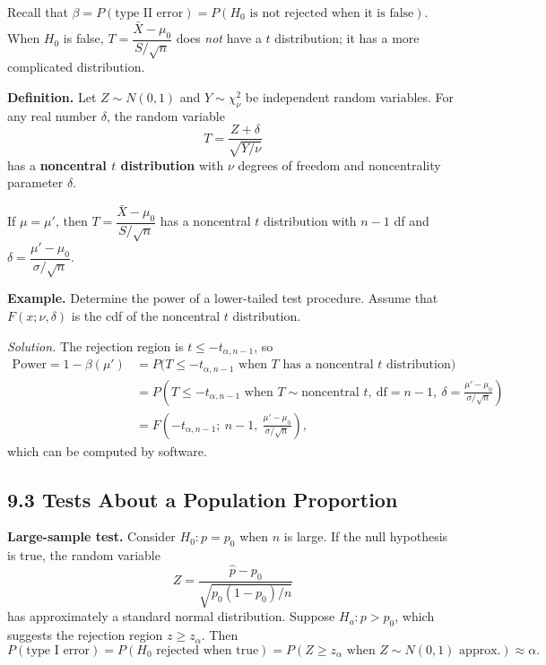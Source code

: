 Recall that $\beta = P(\text{type II error}) = P(H_0 \text{ is not rejected when it is false})$.
When $H_0$ is false, $T=\dfrac{\bar{X}-\mu_0}{S/\sqrt{n}}$ does \emph{not} have a $t$ distribution; it has a more complicated distribution.

\textbf{Definition.} Let $Z\sim N(0,1)$ and $Y\sim\chi^2_\nu$ be independent random variables.
For any real number $\delta$, the random variable
\[
T = \frac{Z+\delta}{\sqrt{Y/\nu}}
\]
has a \textbf{noncentral $t$ distribution} with $\nu$ degrees of freedom and noncentrality parameter $\delta$.

If $\mu=\mu'$, then $T=\dfrac{\bar{X}-\mu_0}{S/\sqrt{n}}$ has a noncentral $t$ distribution with $n-1$ df and
$\delta = \dfrac{\mu'-\mu_0}{\sigma/\sqrt{n}}$.

\textbf{Example.} Determine the power of a lower-tailed test procedure. Assume that
$F(x;\nu,\delta)$ is the cdf of the noncentral $t$ distribution.

\emph{Solution.} The rejection region is $t\le -t_{\alpha,n-1}$, so
\begin{align*}
\text{Power} = 1-\beta(\mu') &= P\big(T\le -t_{\alpha,n-1} \text{ when } T \text{ has a noncentral } t \text{ distribution}\big)\\
&= P\!\left(T\le -t_{\alpha,n-1} \text{ when } T\sim \text{noncentral } t,\ \text{df}=n-1,\ \delta=\frac{\mu'-\mu_0}{\sigma/\sqrt{n}}\right)\\
&= F\!\left(-t_{\alpha,n-1};\ n-1,\ \frac{\mu'-\mu_0}{\sigma/\sqrt{n}}\right),
\end{align*}
which can be computed by software.


\subsection*{9.3 Tests About a Population Proportion}

\textbf{Large-sample test.} Consider $H_0:p=p_0$ when $n$ is large. If the null hypothesis is true, the random variable
\[
Z = \frac{\hat{p}-p_0}{\sqrt{p_0(1-p_0)/n}}
\]
has approximately a standard normal distribution.
Suppose $H_a:p>p_0$, which suggests the rejection region $z\ge z_\alpha$. Then
\[
P(\text{type I error}) = P(H_0 \text{ rejected when true}) = P(Z\ge z_\alpha \text{ when } Z\sim N(0,1) \text{ approx.}) \approx \alpha .
\]

